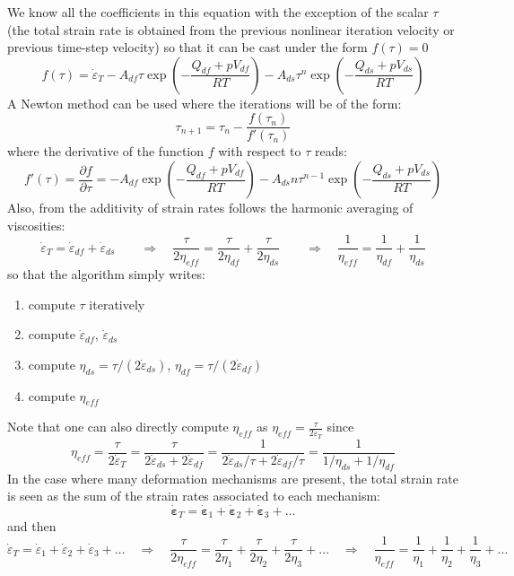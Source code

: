 We know all the coefficients in this equation with the exception of the scalar $\tau$ (the total strain rate
is obtained from the previous nonlinear iteration velocity or previous time-step velocity) so that 
it can be cast under the form $f(\tau)=0$ 
\[
f(\tau)=
\dot{\varepsilon}_{T} - A_{df} \tau \exp\left(-\frac{Q_{df}+pV_{df}}{RT}\right) - A_{ds} \tau^n \exp\left(-\frac{Q_{ds}+pV_{ds}}{RT}\right)
\]
A Newton method can be used where the iterations will be of the form:
\[
\tau_{n+1} = \tau_n - \frac{f(\tau_n)}{f'(\tau_n)}
\]
where the derivative of the function $f$ with respect to $\tau$ reads:
\[
f'(\tau)=\frac{\partial f}{\partial \tau}=
- A_{df} \exp\left(-\frac{Q_{df}+pV_{df}}{RT}\right) - A_{ds} n \tau^{n-1} \exp\left(-\frac{Q_{ds}+pV_{ds}}{RT}\right)
\]
Also, from the additivity of strain rates follows the harmonic averaging of viscosities:
\[
\dot{\varepsilon}_{T}=\dot{\varepsilon}_{df}+\dot{\varepsilon}_{ds} 
\quad
\quad
\Rightarrow
\quad
\frac{\tau}{2\eta_{eff}}=\frac{\tau}{2\eta_{df}}+\frac{\tau}{2\eta_{ds}}
\quad
\quad
\Rightarrow
\quad
\frac{1}{\eta_{eff}}=\frac{1}{\eta_{df}}+\frac{1}{\eta_{ds}}
\]
so that the algorithm simply writes:
\begin{enumerate}
\item compute $\tau$ iteratively
\item compute $\dot{\varepsilon}_{df}$, $\dot{\varepsilon}_{ds}$
\item compute $\eta_{ds}=\tau/(2\dot{\varepsilon}_{ds})$, $\eta_{df}=\tau/(2\dot{\varepsilon}_{df})$
\item compute $\eta_{eff}$
\end{enumerate}
Note that one can also directly compute $\eta_{eff}$ as $\eta_{eff}=\frac{\tau}{2 \dot{\varepsilon}_T}$
since
\[
\eta_{eff}
=\frac{\tau}{2 \dot{\varepsilon}_T}
=\frac{\tau}{2 \dot{\varepsilon}_{ds}   +  2\dot{\varepsilon}_{df}  }
=\frac{1}{2 \dot{\varepsilon}_{ds}/\tau   +  2\dot{\varepsilon}_{df}/\tau  }
=\frac{1}{1/\eta_{ds} +  1/\eta_{df}  }
\]
In the case where many deformation mechanisms are present, the total strain rate is 
seen as the sum of the strain rates associated to each mechanism:
\[
\dot{\bm \varepsilon}_{T}=\dot{\bm \varepsilon}_{1}+\dot{\bm \varepsilon}_{2} +\dot{\bm \varepsilon}_{3} + \dots
\]
and then
\[
\dot{\varepsilon}_{T}=\dot{\varepsilon}_{1}+\dot{\varepsilon}_{2} +\dot{\varepsilon}_{3} + \dots
\quad
\Rightarrow
\quad
\frac{\tau}{2\eta_{eff}}=\frac{\tau}{2\eta_{1}}+\frac{\tau}{2\eta_{2}}+\frac{\tau}{2\eta_{3}}+ \dots
\quad
\Rightarrow
\quad
\frac{1}{\eta_{eff}}=\frac{1}{\eta_{1}}+\frac{1}{\eta_{2}}+\frac{1}{\eta_{3}}+\dots
\]
